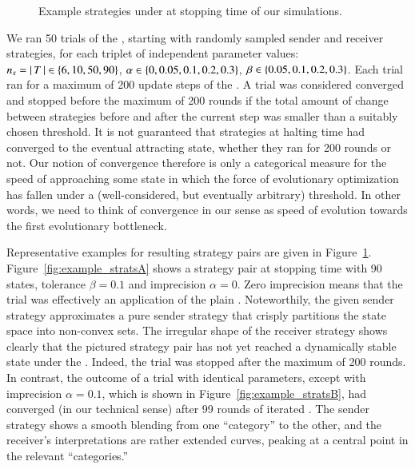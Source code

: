 \documentclass[fleqn,reqno,10pt]{article}
\newcommand{\rd}{\acro{rd}} %
\newcommand{\rdd}{\acro{rdd}} %
\newcommand{\impairment}{\ensuremath{\alpha}} %
\newcommand{\toler}{\ensuremath{\beta}} %
\newcommand{\ns}{\ensuremath{n_s}} %
\begin{document}
\begin{figure}


  \caption{Example strategies under \rdd at stopping time of our simulations.}
  \label{fig:example_strats}
\end{figure}

We ran 50 trials of the \rdd, starting with randomly sampled sender
and receiver strategies, for each triplet of independent parameter
values: $\ns = \card{T} \in \set{6, 10, 50, 90}$, $\impairment \in
\set{0, 0.05, 0.1, 0.2, 0.3}$, $\toler \in \set{0.05, 0.1, 0.2,
  0.3}$. Each trial ran for a maximum of 200 update steps of the
\rdd. A trial was considered converged and stopped before the maximum
of 200 rounds if the total amount of change between strategies before
and after the current \rdd step was smaller than a suitably chosen
threshold. It is not guaranteed that strategies at halting time had
converged to the eventual attracting state, whether they ran for 200
rounds or not. Our notion of convergence therefore is only a
categorical measure for the speed of approaching some state in which
the force of evolutionary optimization has fallen under a
(well-considered, but eventually arbitrary) threshold. In other words,
we need to think of convergence in our sense as speed of evolution
towards the first evolutionary bottleneck.

Representative examples for resulting strategy pairs are given in
Figure~\ref{fig:example_strats}. Figure~\ref{fig:example_stratsA}
shows a strategy pair at stopping time with 90 states, tolerance
$\toler = 0.1$ and imprecision $\impairment = 0$. Zero imprecision
means that the trial was effectively an application of the plain
\rd. Noteworthily, the given sender strategy approximates a pure
sender strategy that crisply partitions the state space into
non-convex sets. The irregular shape of the receiver strategy shows
clearly that the pictured strategy pair has not yet reached a
dynamically stable state under the \rd. Indeed, the trial was stopped
after the maximum of 200 rounds. In contrast, the outcome of a trial
with identical parameters, except with imprecision $\impairment =
0.1$, which is shown in Figure~\ref{fig:example_stratsB}, had
converged (in our technical sense) after 99 rounds of iterated
\rdd. The sender strategy shows a smooth blending from one
``category'' to the other, and the receiver's interpretations are
rather extended curves, peaking at a central point in the relevant
``categories.''
\end{document}
